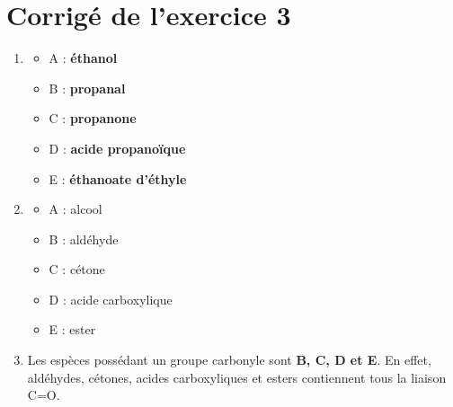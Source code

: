 \documentclass[11pt,a4paper]{article}
\begin{document}
\section*{Corrigé de l'exercice 3}
\begin{enumerate}[label=\textbf{\arabic*.},leftmargin=1.2em]
    \item 
    \begin{itemize}[leftmargin=1.2em]
        \item A : \textbf{éthanol}
        \item B : \textbf{propanal}
        \item C : \textbf{propanone}
        \item D : \textbf{acide propanoïque}
        \item E : \textbf{éthanoate d'éthyle}
    \end{itemize}

    \item 
    \begin{itemize}[leftmargin=1.2em]
        \item A : alcool
        \item B : aldéhyde
        \item C : cétone
        \item D : acide carboxylique
        \item E : ester
    \end{itemize}

    \item Les espèces possédant un groupe carbonyle sont \textbf{B, C, D et E}. En effet, aldéhydes, cétones, acides carboxyliques et esters contiennent tous la liaison C=O.
\end{enumerate}
\end{document}
